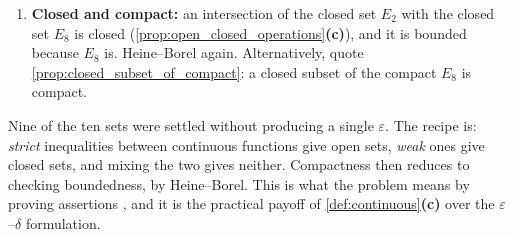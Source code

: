 \begin{exercisesolution}
\begin{enumerate}[label=\textbf{(\alph*)}]
    \begin{ainote}
    The official solution opens this part with . That
    is a slip, since $E_8 = [-6,6]^n$ is bounded. It is $E_3$ that is unbounded, as the official
    solution itself established two parts earlier. The conclusion (that $E_9$ is not compact) is
    correct; only the reason is misattributed.
    \end{ainote}
  \item \textbf{Closed and compact:} an intersection of the closed set $E_2$ with the closed
    set $E_8$ is closed (\cref{prop:open_closed_operations}\textbf{(c)}), and it is bounded
    because $E_8$ is. Heine--Borel again. Alternatively, quote
    \cref{prop:closed_subset_of_compact}: a closed subset of the compact $E_8$ is compact.
\end{enumerate}

\begin{remark}
Nine of the ten sets were settled without producing a single $\varepsilon$. The recipe is:
\emph{strict} inequalities between continuous functions give open sets, \emph{weak} ones give
closed sets, and mixing the two gives neither. Compactness then reduces to checking boundedness,
by Heine--Borel. This is what the problem means by proving assertions , and it is
the practical payoff of \cref{def:continuous}\textbf{(c)} over the $\varepsilon$--$\delta$
formulation.
\end{remark}
\end{exercisesolution}

